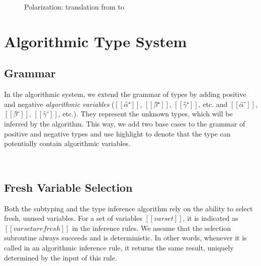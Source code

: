 \documentclass[acmsmall,natbib=false,review,anonymous]{acmart}
\begin{document}
\begin{figure}[h]
  \ottdefnTELAppLabeled{}
\end{figure}

\begin{figure}[h]
  \ottdefnSFfPolLabeled{}
  \caption{Polarization: translation from \systemf to \fexists}
  \label{fig:systemf-polarization}
\end{figure}






\section{Algorithmic Type System}

\subsection{Grammar}

In the algorithmic system, we extend the grammar of types
by adding positive and negative \emph{algorithmic variables}
($[[α̂⁺]]$, $[[β̂⁺]]$, $[[γ̂⁺]]$, etc. and $[[α̂⁻]]$, $[[β̂⁻]]$, $[[γ̂⁻]]$, etc.).
They represent the unknown types, which will be inferred by the algorithm.
This way, we add two base cases to the grammar of 
positive and negative types and use highlight to denote that the type
can potentially contain algorithmic variables.

\begin{definition}
  \label{def:algo-types}
  \hfill\\
  \begin{multicols}{2}
    \ottgrammartabular{
      \ottuN\ottinterrule
    }

    \ottgrammartabular{
      \ottuP\ottinterrule
    }
    \columnbreak
  \end{multicols}
\end{definition}

\subsection{Fresh Variable Selection}
\label{sec:fresh-selection}
Both the subtyping and the type inference algorithm
rely on the ability to select fresh, unused variables.
For a set of variables $[[varset]]$, it is indicated as 
$[[varset are fresh]]$ in the inference rules.
We assume that the selection subroutine always succeeds and is 
deterministic. In other words, whenever it is called in 
an algorithmic inference rule, it returns the same result, 
uniquely determined by the input of this rule.
\end{document}
